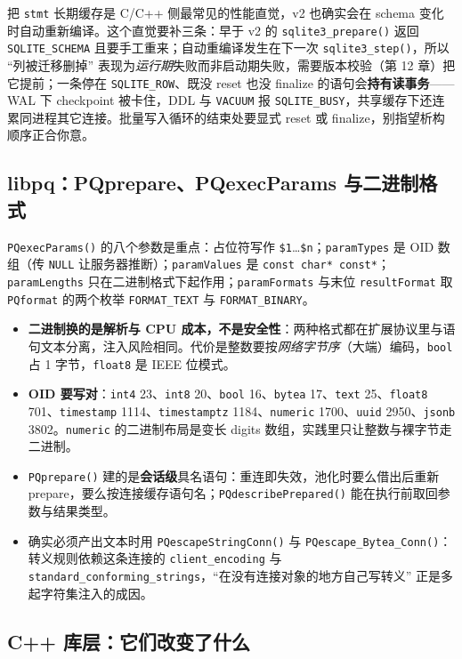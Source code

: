 \documentclass[12pt,a4paper,fontset=fandol]{ctexbook}
\newcommand{\Fn}[1]{\texttt{#1()}}
\newcommand{\Tp}[1]{\texttt{#1}}
\newcommand{\CppJava}{C/C++}
\begin{document}
把 \Tp{stmt} 长期缓存是 \CppJava{} 侧最常见的性能直觉，v2 也确实会在 schema 变化时自动重新编译。这个直觉要补三条：早于 v2 的 \Fn{sqlite3\_prepare} 返回 \Tp{SQLITE\_SCHEMA} 且要手工重来；自动重编译发生在下一次 \Fn{sqlite3\_step}，所以 ``列被迁移删掉'' 表现为\emph{运行期}失败而非启动期失败，需要版本校验（第 12 章）把它提前；一条停在 \Tp{SQLITE\_ROW}、既没 reset 也没 finalize 的语句会\textbf{持有读事务}——WAL 下 checkpoint 被卡住，DDL 与 \texttt{VACUUM} 报 \Tp{SQLITE\_BUSY}，共享缓存下还连累同进程其它连接。批量写入循环的结束处要显式 reset 或 finalize，别指望析构顺序正合你意。

\subsection{libpq：PQprepare、PQexecParams 与二进制格式}

\Fn{PQexecParams} 的八个参数是重点：占位符写作 \texttt{\$1}\ldots\texttt{\$n}；\Tp{paramTypes} 是 OID 数组（传 \Tp{NULL} 让服务器推断）；\Tp{paramValues} 是 \Tp{const char* const*}；\Tp{paramLengths} 只在二进制格式下起作用；\Tp{paramFormats} 与末位 \Tp{resultFormat} 取 \Tp{PQformat} 的两个枚举 \Tp{FORMAT\_TEXT} 与 \Tp{FORMAT\_BINARY}。

\begin{itemize}
  \item \textbf{二进制换的是解析与 CPU 成本，不是安全性}：两种格式都在扩展协议里与语句文本分离，注入风险相同。代价是整数要按\emph{网络字节序}（大端）编码，\Tp{bool} 占 1 字节，\Tp{float8} 是 IEEE 位模式。
  \item \textbf{OID 要写对}：\Tp{int4} 23、\Tp{int8} 20、\Tp{bool} 16、\Tp{bytea} 17、\Tp{text} 25、\Tp{float8} 701、\Tp{timestamp} 1114、\Tp{timestamptz} 1184、\Tp{numeric} 1700、\Tp{uuid} 2950、\Tp{jsonb} 3802。\Tp{numeric} 的二进制布局是变长 digits 数组，实践里只让整数与裸字节走二进制。
  \item \Fn{PQprepare} 建的是\textbf{会话级}具名语句：重连即失效，池化时要么借出后重新 prepare，要么按连接缓存语句名；\Fn{PQdescribePrepared} 能在执行前取回参数与结果类型。
  \item 确实必须产出文本时用 \Fn{PQescapeStringConn} 与 \Fn{PQescape\_\allowbreak Bytea\_\allowbreak Conn}：转义规则依赖这条连接的 \Tp{client\_encoding} 与 \Tp{standard\_\allowbreak conforming\_\allowbreak strings}，``在没有连接对象的地方自己写转义'' 正是多起字符集注入的成因。
\end{itemize}

\subsection{C++ 库层：它们改变了什么}
\end{document}
